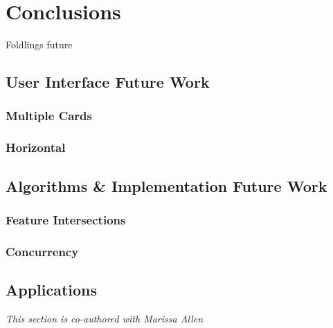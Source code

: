 \chapter{Conclusions}

Foldlings future

\section{User Interface Future Work}\label{user-interface-future-work}

\subsection{Multiple Cards}\label{multiple-cards}

\subsection{Horizontal}\label{horizontal}

\section{Algorithms \& Implementation Future
Work}\label{algorithms-implementation-future-work}

\subsection{Feature Intersections}\label{feature-intersections}

\subsection{Concurrency}\label{concurrency}

\section{Applications}\label{applications}

\emph{This section is co-authored with Marissa Allen}
